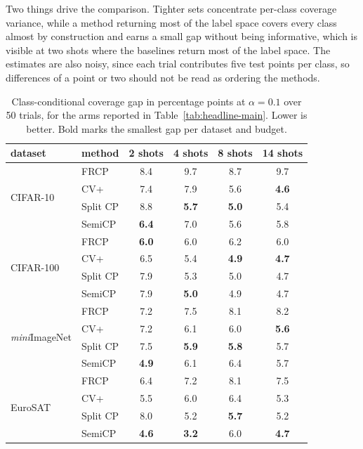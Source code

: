 Two things drive the comparison. Tighter sets concentrate per-class
coverage variance, while a method returning most of the label space
covers every class almost by construction and earns a small gap
without being informative, which is visible at two shots where the
baselines return most of the label space. The estimates are also
noisy, since each trial contributes five test points per class, so
differences of a point or two should not be read as ordering the
methods.

\begin{table}[h]
\caption{Class-conditional coverage gap in percentage points at
$\alpha = 0.1$ over 50 trials, for the arms reported in
Table~\ref{tab:headline-main}. Lower is better. Bold marks the
smallest gap per dataset and budget.}
\label{tab:app-covgap}
\begin{center}
\small
\setlength{\tabcolsep}{5pt}
\begin{tabular}{llcccc}
\toprule
dataset & method & 2 shots & 4 shots & 8 shots & 14 shots\\
\midrule
\multirow{4}{*}{CIFAR-10}
 & FRCP & 8.4 & 9.7 & 8.7 & 9.7\\
 & CV+ & 7.4 & 7.9 & 5.6 & \textbf{4.6}\\
 & Split CP & 8.8 & \textbf{5.7} & \textbf{5.0} & 5.4\\
 & SemiCP & \textbf{6.4} & 7.0 & 5.6 & 5.8\\
\midrule
\multirow{4}{*}{CIFAR-100}
 & FRCP & \textbf{6.0} & 6.0 & 6.2 & 6.0\\
 & CV+ & 6.5 & 5.4 & \textbf{4.9} & \textbf{4.7}\\
 & Split CP & 7.9 & 5.3 & 5.0 & 4.7\\
 & SemiCP & 7.9 & \textbf{5.0} & 4.9 & 4.7\\
\midrule
\multirow{4}{*}{\emph{mini}ImageNet}
 & FRCP & 7.2 & 7.5 & 8.1 & 8.2\\
 & CV+ & 7.2 & 6.1 & 6.0 & \textbf{5.6}\\
 & Split CP & 7.5 & \textbf{5.9} & \textbf{5.8} & 5.7\\
 & SemiCP & \textbf{4.9} & 6.1 & 6.4 & 5.7\\
\midrule
\multirow{4}{*}{EuroSAT}
 & FRCP & 6.4 & 7.2 & 8.1 & 7.5\\
 & CV+ & 5.5 & 6.0 & 6.4 & 5.3\\
 & Split CP & 8.0 & 5.2 & \textbf{5.7} & 5.2\\
 & SemiCP & \textbf{4.6} & \textbf{3.2} & 6.0 & \textbf{4.7}\\
\bottomrule
\end{tabular}
\end{center}
\end{table}

